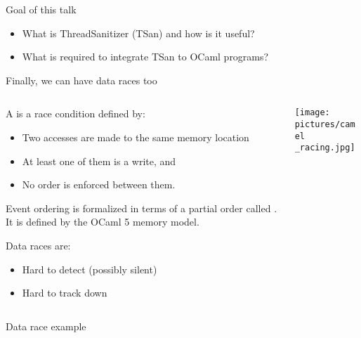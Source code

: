 \begin{frame}{Goal of this talk}
  \begin{itemize}
    \item What is ThreadSanitizer (TSan) and how is it useful?
    \item What is required to integrate TSan to OCaml programs?
  \end{itemize}
\end{frame}

\begin{frame}{Finally, we can have data races too}
  \begin{columns}
    \begin{column}{0.5\textwidth}
      A  is a race condition defined by:
      \begin{itemize}
        \item Two accesses are made to the same memory location\,
        \item At least one of them is a write, and
        \item No order is enforced between them.
      \end{itemize}
      \medskip
      \begin{footnotesize}
      Event ordering is formalized in terms of a partial order called . It is defined by the OCaml 5 memory model.\\
      \end{footnotesize}
      \medskip
      Data races are:
      \begin{itemize}
        \item Hard to detect (possibly silent)
        \item Hard to track down
      \end{itemize}
    \end{column}
    \begin{column}{0.5\textwidth}
      \texttt{[image: pictures/camel\\\_racing.jpg]}
    \end{column}
  \end{columns}
\end{frame}

\begin{frame}{Data race example}
  \begin{columns}[T]
    \begin{column}{0.4\textwidth}
    \end{column}
    \begin{column}{0.4\textwidth}
      \flushright
    \end{column}
  \end{columns}
\end{frame}

